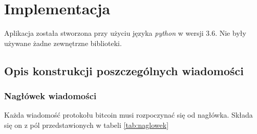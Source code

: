 \section{Implementacja}
Aplikacja została stworzona przy użyciu języka \textit{python} w wersji 3.6. Nie były używane żadne zewnętrzne biblioteki.
\subsection{Opis konstrukcji poszczególnych wiadomości}

\subsubsection{Nagłówek wiadomości}
Każda wiadomość protokołu bitcoin musi rozpoczynać się od nagłówka. Składa się on z pól przedstawionych w tabeli \ref{tab:naglowek}
